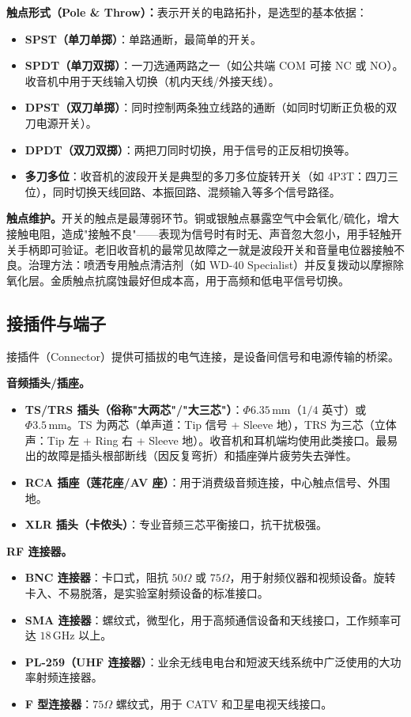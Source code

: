 \documentclass[12pt,UTF8]{ctexbook}
\begin{document}
\textbf{触点形式（Pole \& Throw）：}表示开关的电路拓扑，是选型的基本依据：
\begin{itemize}
  \item \textbf{SPST（单刀单掷）}：单路通断，最简单的开关。
  \item \textbf{SPDT（单刀双掷）}：一刀选通两路之一（如公共端 COM 可接 NC 或 NO）。收音机中用于天线输入切换（机内天线/外接天线）。
  \item \textbf{DPST（双刀单掷）}：同时控制两条独立线路的通断（如同时切断正负极的双刀电源开关）。
  \item \textbf{DPDT（双刀双掷）}：两把刀同时切换，用于信号的正反相切换等。
  \item \textbf{多刀多位}：收音机的波段开关是典型的多刀多位旋转开关（如 4P3T：四刀三位），同时切换天线回路、本振回路、混频输入等多个信号路径。
\end{itemize}

\textbf{触点维护。}开关的触点是最薄弱环节。铜或银触点暴露空气中会氧化/硫化，增大接触电阻，造成"接触不良"——表现为信号时有时无、声音忽大忽小，用手轻触开关手柄即可验证。老旧收音机的最常见故障之一就是波段开关和音量电位器接触不良。治理方法：喷洒专用触点清洁剂（如 WD-40 Specialist）并反复拨动以摩擦除氧化层。金质触点抗腐蚀最好但成本高，用于高频和低电平信号切换。

\subsection{接插件与端子}

接插件（Connector）提供可插拔的电气连接，是设备间信号和电源传输的桥梁。

\textbf{音频插头/插座。}
\begin{itemize}
  \item \textbf{TS/TRS 插头（俗称"大两芯"/"大三芯"）}：$\Phi 6.35\,\mathrm{mm}$（$1/4$ 英寸）或 $\Phi 3.5\,\mathrm{mm}$。TS 为两芯（单声道：Tip 信号 + Sleeve 地），TRS 为三芯（立体声：Tip 左 + Ring 右 + Sleeve 地）。收音机和耳机端均使用此类接口。最易出的故障是插头根部断线（因反复弯折）和插座弹片疲劳失去弹性。
  \item \textbf{RCA 插座（莲花座/AV 座）}：用于消费级音频连接，中心触点信号、外围地。
  \item \textbf{XLR 插头（卡侬头）}：专业音频三芯平衡接口，抗干扰极强。
\end{itemize}

\textbf{RF 连接器。}
\begin{itemize}
  \item \textbf{BNC 连接器}：卡口式，阻抗 $50\Omega$ 或 $75\Omega$，用于射频仪器和视频设备。旋转卡入、不易脱落，是实验室射频设备的标准接口。
  \item \textbf{SMA 连接器}：螺纹式，微型化，用于高频通信设备和天线接口，工作频率可达 $18\,\mathrm{GHz}$ 以上。
  \item \textbf{PL-259（UHF 连接器）}：业余无线电电台和短波天线系统中广泛使用的大功率射频连接器。
  \item \textbf{F 型连接器}：$75\Omega$ 螺纹式，用于 CATV 和卫星电视天线接口。
\end{itemize}
\end{document}
